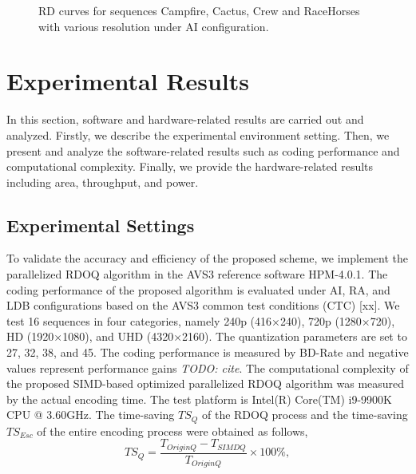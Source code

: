 \documentclass[lettersize,journal]{IEEEtran}
\begin{document}
\begin{figure}[htbp]
	\caption{RD curves for sequences Campfire, Cactus, Crew and RaceHorses with various resolution under AI configuration.}
    \label{RD curves}
\end{figure}

\section{Experimental Results}
\label{sec:5}
In this section, software and hardware-related results are carried out and analyzed. Firstly, we describe the experimental environment setting. Then, we present and analyze the software-related results such as coding performance and computational complexity. Finally, we provide the hardware-related results including area, throughput, and power. 

\subsection{Experimental Settings} 
To validate the accuracy and efficiency of the proposed scheme, we implement the parallelized RDOQ algorithm in the AVS3 reference software HPM-4.0.1. The coding performance of the proposed algorithm is evaluated under AI, RA, and LDB configurations based on the AVS3 common test conditions (CTC) [xx]. We test 16 sequences in four categories, namely 240p (416×240), 720p (1280×720), HD (1920×1080), and UHD (4320×2160). The quantization parameters are set to 27, 32, 38, and 45. The coding performance is measured by BD-Rate and negative values represent performance gains \emph{TODO: cite}. The computational complexity of the proposed SIMD-based optimized parallelized RDOQ algorithm was measured by the actual encoding time. The test platform is Intel(R) Core(TM) i9-9900K CPU @ 3.60GHz. The time-saving $TS_{Q}$ of the RDOQ process and the time-saving $TS_{Esc}$ of the entire encoding process were obtained as follows, 
\begin{equation}
	\label{TSQ}
    TS_{Q} = \frac{T_{OriginQ}-T_{SIMDQ}}{T_{OriginQ}} \times 100\%,
\end{equation}
\end{document}
